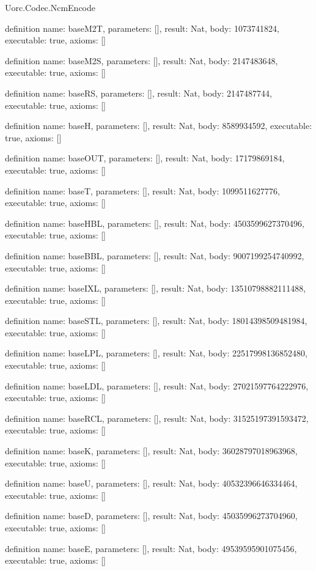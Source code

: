 \begin{lexlean}{Uorc.Codec.NcmEncode}
\begin{semanticmodule}
definition{
  name: baseM2T,
  parameters: [],
  result: Nat,
  body: 1073741824,
  executable: true,
  axioms: []
}

definition{
  name: baseM2S,
  parameters: [],
  result: Nat,
  body: 2147483648,
  executable: true,
  axioms: []
}

definition{
  name: baseRS,
  parameters: [],
  result: Nat,
  body: 2147487744,
  executable: true,
  axioms: []
}

definition{
  name: baseH,
  parameters: [],
  result: Nat,
  body: 8589934592,
  executable: true,
  axioms: []
}

definition{
  name: baseOUT,
  parameters: [],
  result: Nat,
  body: 17179869184,
  executable: true,
  axioms: []
}

definition{
  name: baseT,
  parameters: [],
  result: Nat,
  body: 1099511627776,
  executable: true,
  axioms: []
}

definition{
  name: baseHBL,
  parameters: [],
  result: Nat,
  body: 4503599627370496,
  executable: true,
  axioms: []
}

definition{
  name: baseBBL,
  parameters: [],
  result: Nat,
  body: 9007199254740992,
  executable: true,
  axioms: []
}

definition{
  name: baseIXL,
  parameters: [],
  result: Nat,
  body: 13510798882111488,
  executable: true,
  axioms: []
}

definition{
  name: baseSTL,
  parameters: [],
  result: Nat,
  body: 18014398509481984,
  executable: true,
  axioms: []
}

definition{
  name: baseLPL,
  parameters: [],
  result: Nat,
  body: 22517998136852480,
  executable: true,
  axioms: []
}

definition{
  name: baseLDL,
  parameters: [],
  result: Nat,
  body: 27021597764222976,
  executable: true,
  axioms: []
}

definition{
  name: baseRCL,
  parameters: [],
  result: Nat,
  body: 31525197391593472,
  executable: true,
  axioms: []
}

definition{
  name: baseK,
  parameters: [],
  result: Nat,
  body: 36028797018963968,
  executable: true,
  axioms: []
}

definition{
  name: baseU,
  parameters: [],
  result: Nat,
  body: 40532396646334464,
  executable: true,
  axioms: []
}

definition{
  name: baseD,
  parameters: [],
  result: Nat,
  body: 45035996273704960,
  executable: true,
  axioms: []
}

definition{
  name: baseE,
  parameters: [],
  result: Nat,
  body: 49539595901075456,
  executable: true,
  axioms: []
}


\end{semanticmodule}
\end{lexlean}
